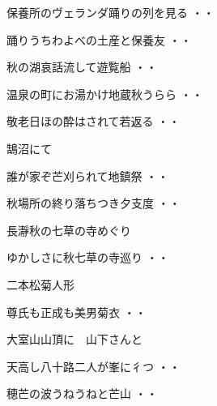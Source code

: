 \vspace{0.6cm}
\begin{shiika}保養所のヴェランダ踊りの列を見る
\hfill{・・}\end{shiika}
\vspace{0.6cm}
\begin{shiika}踊りうちわよべの土産と保養友
\hfill{・・}\end{shiika}
\vspace{0.6cm}
\begin{shiika}秋の湖哀話流して遊覧船
\hfill{・・}\end{shiika}
\vspace{0.6cm}
\begin{shiika}温泉の町にお湯かけ地蔵秋うらら
\hfill{・・}\end{shiika}
\vspace{0.6cm}
\begin{shiika}敬老日ほの酔はされて若返る
\hfill{・・}\end{shiika}
\vspace{0.6cm}
鵠沼にて
\begin{shiika}誰が家ぞ芒刈られて地鎮祭
\hfill{・・}\end{shiika}
\begin{shiika}秋場所の終り落ちつき夕支度
\hfill{・・}\end{shiika}
\vspace{0.6cm}
長瀞秋の七草の寺めぐり
\begin{shiika}ゆかしさに秋七草の寺巡り
\hfill{・・}\end{shiika}
\vspace{0.6cm}
二本松菊人形		
\begin{shiika}尊氏も正成も美男菊衣
\hfill{・・}\end{shiika}
\vspace{0.6cm}
大室山山頂に　山下さんと
\begin{shiika}天高し八十路二人が峯に彳つ
\hfill{・・}\end{shiika}
\begin{shiika}穂芒の波うねうねと芒山
\hfill{・・}\end{shiika}
\vspace{0.6cm}
